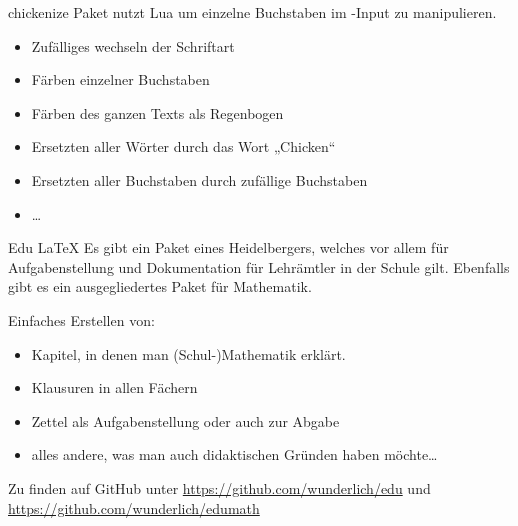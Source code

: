\documentclass[
	vorläufig=false,
	datum=2022-12-22,
	titel={Witziges, Obskures und Sinnvolles…},
	web=false,
 	aspectratio=1610,
 	max,
]{../tex/latexkurs-slides}
\begin{document}
\begin{frame}[t]{chickenize}
\vfill
	Paket  nutzt Lua um einzelne Buchstaben im -Input zu manipulieren.
	
	\begin{itemize}
		\item Zufälliges wechseln der Schriftart
		\item Färben einzelner Buchstaben
		\item Färben des ganzen Texts als Regenbogen
		\item Ersetzten aller Wörter durch das Wort „Chicken“
		\item Ersetzten aller Buchstaben durch zufällige Buchstaben
		\item …
	\end{itemize}
\end{frame}

\begin{frame}{Edu \LaTeX}
    Es gibt ein Paket eines Heidelbergers, welches vor allem für Aufgabenstellung und Dokumentation für Lehrämtler in der Schule gilt. Ebenfalls gibt es ein ausgegliedertes Paket für Mathematik.

\vspace{1em}
    Einfaches Erstellen von:
    \begin{itemize}
        \item Kapitel, in denen man (Schul-)Mathematik erklärt.
        \item Klausuren in allen Fächern
        \item Zettel als Aufgabenstellung oder auch zur Abgabe
        \item alles andere, was man auch didaktischen Gründen haben möchte…
    \end{itemize}
\vspace{1em}
    Zu finden auf GitHub unter \url{https://github.com/wunderlich/edu} und \url{https://github.com/wunderlich/edumath}
\end{frame}
\end{document}
